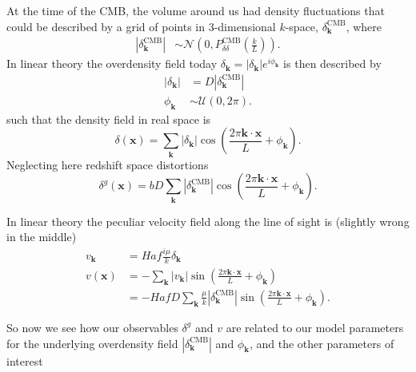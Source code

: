 \documentclass[11pt, oneside]{article}   	%
\begin{document}
At the time of the CMB, the volume
around us had density fluctuations
that could be described
by a grid of points in 3-dimensional
$k$-space, $\delta^{\text{CMB}}_{\mathbf{k}}$,  where 
\begin{align}
    |\delta^{\text{CMB}}_{\mathbf{k}}| & \sim \mathcal{N}\left(0,P^{\text{CMB}}_{\delta\delta}\left(\frac{k}{L}\right)\right).
\end{align}
In linear theory the overdensity
field
today $\delta_{\mathbf{k}} = |\delta_{\mathbf{k}}|e^{i\phi_{\mathbf{k}}}$ is then described
by
\begin{align}
    |\delta_{\mathbf{k}}| & = D |\delta^{\text{CMB}}_{\mathbf{k}}|
\\
    \phi_{\mathbf{k}} & \sim \mathcal{U}(0,2\pi).
\end{align}
such that the density field in real space is
\begin{equation}
    \delta(\mathbf{x}) = \sum_{\mathbf{k}} |\delta_\mathbf{k}| \cos{\left(\frac{2\pi \mathbf{k} \cdot \mathbf{x}}{L} + \phi_\mathbf{k}\right)}.
\end{equation}
Neglecting here redshift space
distortions
\begin{equation}
    \delta^g(\mathbf{x}) = bD \sum_{\mathbf{k}} |\delta^{\text{CMB}}_\mathbf{k}| \cos{\left(\frac{2\pi \mathbf{k} \cdot \mathbf{x}}{L} + \phi_\mathbf{k}\right)}.
\end{equation}

In linear theory the peculiar
velocity field along the line of
sight is (slightly wrong in
the middle)
\begin{align}
   v_\mathbf{k} & = Haf \frac{i\mu}{k} \delta_\mathbf{k}\\
       v(\mathbf{x}) & = -\sum_{\mathbf{k}} |v_\mathbf{k}| \sin{\left(\frac{2\pi \mathbf{k} \cdot \mathbf{x}}{L} + \phi_\mathbf{k}\right)}\\
       & = -HafD\sum_{\mathbf{k}}
       \frac{\mu}{k} |\delta^{\text{CMB}}_\mathbf{k}| \sin{\left(\frac{2\pi \mathbf{k} \cdot \mathbf{x}}{L} + \phi_\mathbf{k}\right)}.
\end{align}

So now we see how our observables
$\delta^g$ and $v$ are related to
our model parameters for
the underlying overdensity field
$|\delta^{\text{CMB}}_\mathbf{k}|$
and $\phi_\mathbf{k}$,
and the other parameters of interest
\end{document}
